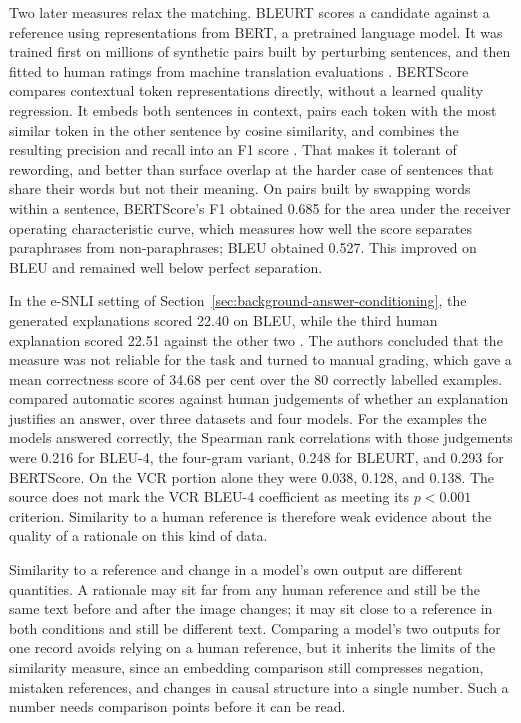 Two later measures relax the matching. BLEURT scores a candidate against a
reference using representations from BERT, a pretrained language model. It was
trained first on millions of synthetic pairs built by perturbing sentences, and
then fitted to human ratings from machine translation evaluations
\citep{DBLP:conf/acl/SellamDP20}. BERTScore compares contextual token
representations directly, without a learned quality regression. It embeds both
sentences in context, pairs each token with the most similar token in the other
sentence by cosine similarity, and combines the resulting precision and recall
into an F1 score \citep{DBLP:conf/iclr/ZhangKWWA20}. That makes it tolerant of
rewording, and better than surface overlap at the harder case of sentences that
share their words but not their meaning. On pairs built by swapping words within a
sentence, BERTScore's F1
obtained 0.685 for the area under the receiver operating characteristic curve,
which measures how well the score separates paraphrases from non-paraphrases;
BLEU obtained 0.527. This improved on BLEU and remained well below perfect
separation.

In the e-SNLI setting of Section~\ref{sec:background-answer-conditioning}, the
generated explanations scored 22.40 on BLEU, while the third human explanation
scored 22.51 against the other two \citep{CamburuEtAl18ESNLI}. The authors
concluded that the measure was not reliable for the task and turned to manual
grading, which gave a mean correctness score of 34.68 per cent over the 80
correctly labelled examples.
\citet{KayserEtAl21EVIL} compared automatic scores against human judgements of
whether an explanation justifies an answer, over three datasets and four models.
For the examples the models answered correctly, the Spearman rank correlations with
those judgements were 0.216 for BLEU-4, the four-gram variant, 0.248 for BLEURT,
and 0.293 for BERTScore. On the VCR portion alone they were 0.038, 0.128, and
0.138. The source does not mark the VCR BLEU-4 coefficient as meeting its
$p<0.001$ criterion. Similarity to a human
reference is therefore weak evidence about the quality of a rationale on this kind
of data.

Similarity to a reference and change in a model's own output are different
quantities. A rationale may sit far from any human reference and still be the same
text before and after the image changes; it may sit close to a reference in both
conditions and still be different text. Comparing a model's two outputs for one
record avoids relying on a human reference, but it inherits the limits of the
similarity measure, since an embedding comparison still compresses negation, mistaken
references, and changes in causal structure into a single number. Such a number
needs comparison points before it can be read.

